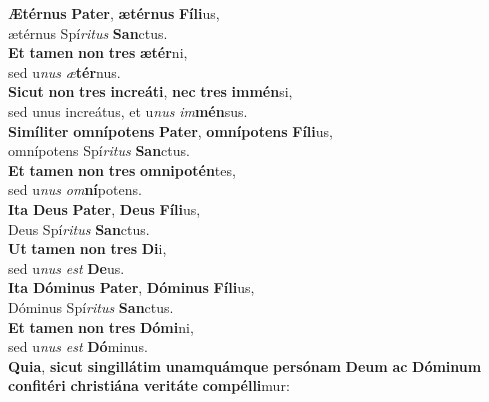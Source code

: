 \evenverse \textbf{Æ}\textbf{tér}\textbf{nus} \textbf{Pa}\textbf{ter}, \textbf{æ}\textbf{tér}\textbf{nus} \textbf{Fí}\textbf{li}us,~\*\\
\evenverse ætérnus Spí\textit{ri}\textit{tus} \textbf{San}ctus.\\
\oddverse \textbf{Et} \textbf{ta}\textbf{men} \textbf{non} \textbf{tres} \textbf{æ}\textbf{tér}ni,~\*\\
\oddverse sed u\textit{nus} \textit{æ}\textbf{tér}nus.\\
\evenverse \textbf{Si}\textbf{cut} \textbf{non} \textbf{tres} \textbf{in}\textbf{cre}\textbf{á}\textbf{ti}, \textbf{nec} \textbf{tres} \textbf{im}\textbf{mén}si,~\*\\
\evenverse sed unus increátus, et u\textit{nus} \textit{im}\textbf{mén}sus.\\
\oddverse \textbf{Si}\textbf{mí}\textbf{li}\textbf{ter} \textbf{om}\textbf{ní}\textbf{po}\textbf{tens} \textbf{Pa}\textbf{ter}, \textbf{om}\textbf{ní}\textbf{po}\textbf{tens} \textbf{Fí}\textbf{li}us,~\*\\
\oddverse omnípotens Spí\textit{ri}\textit{tus} \textbf{San}ctus.\\
\evenverse \textbf{Et} \textbf{ta}\textbf{men} \textbf{non} \textbf{tres} \textbf{om}\textbf{ni}\textbf{po}\textbf{tén}tes,~\*\\
\evenverse sed u\textit{nus} \textit{om}\textbf{ní}potens.\\
\oddverse \textbf{I}\textbf{ta} \textbf{De}\textbf{us} \textbf{Pa}\textbf{ter}, \textbf{De}\textbf{us} \textbf{Fí}\textbf{li}us,~\*\\
\oddverse Deus Spí\textit{ri}\textit{tus} \textbf{San}ctus.\\
\evenverse \textbf{Ut} \textbf{ta}\textbf{men} \textbf{non} \textbf{tres} \textbf{Di}i,~\*\\
\evenverse sed u\textit{nus} \textit{est} \textbf{De}us.\\
\oddverse \textbf{I}\textbf{ta} \textbf{Dó}\textbf{mi}\textbf{nus} \textbf{Pa}\textbf{ter}, \textbf{Dó}\textbf{mi}\textbf{nus} \textbf{Fí}\textbf{li}us,~\*\\
\oddverse Dóminus Spí\textit{ri}\textit{tus} \textbf{San}ctus.\\
\evenverse \textbf{Et} \textbf{ta}\textbf{men} \textbf{non} \textbf{tres} \textbf{Dó}\textbf{mi}ni,~\*\\
\evenverse sed u\textit{nus} \textit{est} \textbf{Dó}minus.\\
\oddverse \textbf{Qui}\textbf{a}, \textbf{si}\textbf{cut} \textbf{sin}\textbf{gil}\textbf{lá}\textbf{tim} \textbf{u}\textbf{nam}\textbf{quám}\textbf{que} \textbf{per}\textbf{só}\textbf{nam} \textbf{De}\textbf{um} \textbf{ac} \textbf{Dó}\textbf{mi}\textbf{num} \textbf{con}\textbf{fi}\textbf{té}\textbf{ri} \textbf{chri}\textbf{sti}\textbf{á}\textbf{na} \textbf{ve}\textbf{ri}\textbf{tá}\textbf{te} \textbf{com}\textbf{pél}\textbf{li}mur:~\*\\
